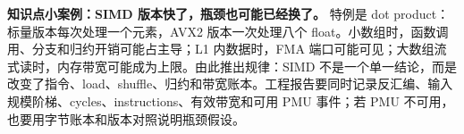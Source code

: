 \begin{casebox}
\textbf{知识点小案例：SIMD 版本快了，瓶颈也可能已经换了。}
特例是 dot product：标量版本每次处理一个元素，AVX2 版本一次处理八个 float。小数组时，函数调用、分支和归约开销可能占主导；L1 内数据时，FMA 端口可能可见；大数组流式读时，内存带宽可能成为上限。由此推出规律：SIMD 不是一个单一结论，而是改变了指令、load、shuffle、归约和带宽账本。工程报告要同时记录反汇编、输入规模阶梯、cycles、instructions、有效带宽和可用 PMU 事件；若 PMU 不可用，也要用字节账本和版本对照说明瓶颈假设。
\end{casebox}
